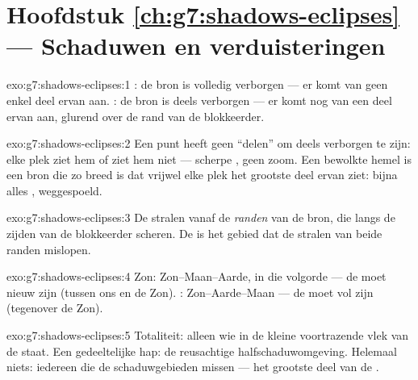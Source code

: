 \section*{Hoofdstuk \ref{ch:g7:shadows-eclipses} --- Schaduwen en verduisteringen}

\begin{solution}{exo:g7:shadows-eclipses:1}
: de bron is volledig verborgen --- er komt  van
geen enkel deel ervan aan. : de bron is deels verborgen
--- er komt nog  van een deel ervan aan, glurend over de rand van
de blokkeerder.
\end{solution}

\begin{solution}{exo:g7:shadows-eclipses:2}
Een punt heeft geen ``delen'' om deels verborgen te zijn: elke plek
ziet hem of ziet hem niet --- scherpe , geen zoom. Een bewolkte
hemel is een bron die zo breed is dat vrijwel elke plek het grootste
deel ervan ziet: bijna alles ,  weggespoeld.
\end{solution}

\begin{solution}{exo:g7:shadows-eclipses:3}
De stralen vanaf de \emph{randen} van de bron, die langs de zijden van
de blokkeerder scheren. De  is het gebied dat de stralen
van beide randen mislopen.
\end{solution}

\begin{solution}{exo:g7:shadows-eclipses:4}
Zon: Zon--Maan--Aarde, in die volgorde --- de  moet nieuw zijn
(tussen ons en de Zon). : Zon--Aarde--Maan --- de  moet vol
zijn (tegenover de Zon).
\end{solution}

\begin{solution}{exo:g7:shadows-eclipses:5}
Totaliteit: alleen wie in de kleine voortrazende vlek van de
 staat. Een gedeeltelijke hap: de reusachtige
halfschaduwomgeving. Helemaal niets: iedereen die de
schaduwgebieden missen --- het grootste deel van de .
\end{solution}

